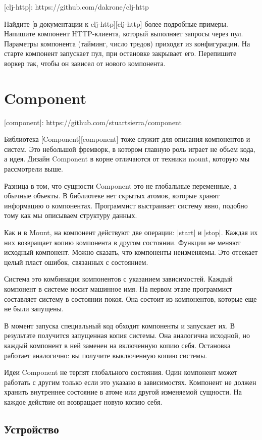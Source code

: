[clj-http]: https://github.com/dakrone/clj-http

Найдите [в документации к clj-http][clj-http] более подробные примеры. Напишите
компонент HTTP-клиента, который выполняет запросы через пул. Параметры
компонента (тайминг, число тредов) приходят из конфигурации. На старте компонент
запускает пул, при остановке закрывает его. Перепишите воркер так, чтобы он
зависел от нового компонента.

\section{Component}

[component]: https://github.com/stuartsierra/component

Библиотека [Component][component] тоже служит для описания компонентов и
систем. Это небольшой фремворк, в котором главную роль играет не объем кода, а
идея. Дизайн Component в корне отличаются от техники mount, которую мы
рассмотрели выше.

Разница в том, что сущности Component это не глобальные переменные, а обычные
объекты. В библиотеке нет скрытых атомов, которые хранят информацию о
компонентах. Программист выстраивает систему явно, подобно тому как мы описываем
структуру данных.

Как и в Mount, на компонент действуют две операции: \spverb|start| и \spverb|stop|. Каждая их
них возвращает копию компонента в другом состоянии. Функции не меняют исходный
компонент. Можно сказать, что компоненты неизменяемы. Это отсекает целый пласт
ошибок, связанных с состоянием.

Система это комбинация компонентов с указанием зависимостей. Каждый компонент в
системе носит машинное имя. На первом этапе программист составляет систему в
состоянии покоя. Она состоит из компонентов, которые еще не были запущены.

В момент запуска специальный код обходит компоненты и запускает их. В результате
получится запущенная копия системы. Она аналогична исходной, но каждый компонент
в ней заменен на включенную копию себя. Остановка работает аналогично: вы
получите выключенную копию системы.

Идеи Component не терпят глобального состояния. Один компонент может работать с
другим только если это указано в зависимостях. Компонент не должен хранить
внутреннее состояние в атоме или другой изменяемой сущности. На каждое действие
он возвращает новую копию себя.

\subsection{Устройство}

